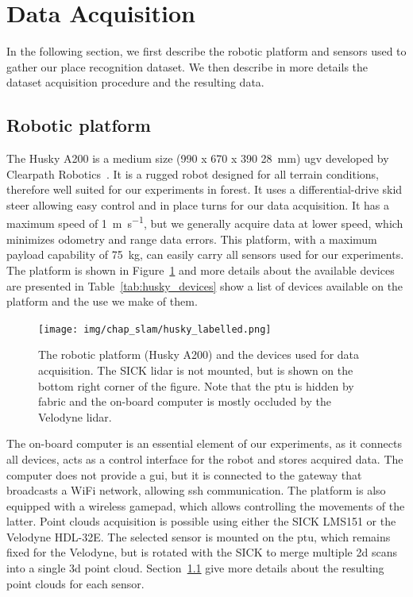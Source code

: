 \section{Data Acquisition}
\label{sec:chap_slam_data_acquisition}

In the following section, we first describe the robotic platform and sensors used to gather our place recognition dataset. We then describe in more details the dataset acquisition procedure and the resulting data.


\subsection{Robotic platform}
\label{ssec:chap_slam_platform}

The Husky A200 is a medium size (990 x 670 x 390 \SI{28}{\milli\meter}) \gls{ugv} developed by Clearpath Robotics~\cite{ClearpathWeb}. It is a rugged robot designed for all terrain conditions, therefore well suited for our experiments in forest. It uses a differential-drive skid steer allowing easy control and in place turns for our data acquisition. It has a maximum speed of \SI{1}{\meter\per\second}, but we generally acquire data at lower speed, which minimizes odometry and range data errors. This platform, with a maximum payload capability of \SI{75}{\kilo\gram}, can easily carry all sensors used for our experiments. The platform is shown in Figure~\ref{fig:chap_slam_husky} and more details about the available devices are presented in Table~\ref{tab:husky_devices} show a list of devices available on the platform and the use we make of them.

\begin{figure}[h]
    \centering
    \texttt{[image: img/chap\_slam/husky\_labelled.png]}
    \caption{The robotic platform (Husky A200) and the devices used for data acquisition. The SICK \gls{lidar} is not mounted, but is shown on the bottom right corner of the figure. Note that the \gls{ptu} is hidden by fabric and the on-board computer is mostly occluded by the Velodyne \gls{lidar}.}
    \label{fig:chap_slam_husky}
\end{figure}

The on-board computer is an essential element of our experiments, as it connects all devices, acts as a control interface for the robot and stores acquired data. The computer does not provide a \gls{gui}, but it is connected to the gateway that broadcasts a WiFi network, allowing \gls{ssh} communication. The platform is also equipped with a wireless gamepad, which allows controlling the movements of the latter. Point clouds acquisition is possible using either the SICK LMS151 or the Velodyne HDL-32E. The selected sensor is mounted on the \gls{ptu}, which remains fixed for the Velodyne, but is rotated with the SICK to merge multiple \gls{2d} scans into a single \gls{3d} point cloud. Section~\ref{ssec:chap_slam_platform} give more details about the resulting point clouds for each sensor.


